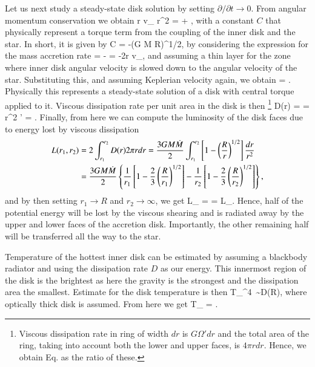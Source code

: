 Let us next study a steady-state disk solution by setting $\partial/\partial t \rightarrow 0$.
From angular momentum conservation we obtain
\be
r \Sigma v_{} r^2 \Omega =  + ,
\ee
with a constant $C$ that physically represent a torque term from the coupling of the inner disk and the star.
In short, it is given by
\be
C = -\Mdot (G M R)^{1/2},
\ee
by considering the expression for the mass accretion rate 
\be
\Mdot = - = -2\pi r \Sigma v_{},
\ee
and assuming a thin layer for the zone where inner disk angular velocity is slowed down to the angular velocity of the star.
Substituting this, and assuming Keplerian velocity again, we obtain
\be
\nu \Sigma = \frac{\Mdot}{3\pi} .
\ee
Physically this represents a steady-state solution of a disk with central torque applied to it.
Viscous dissipation rate per unit area in the disk is then%
\footnote{Viscous dissipation rate in ring of width $dr$ is $G \Omega' dr$ and the total area of the ring, taking into account both the lower and upper faces, is $4\pi r dr$. Hence, we obtain Eq.  as the ratio of these.
}
\be\label{eq:D}
D(r) =  =  \nu \Sigma r^2 \Omega' =  .
\ee
Finally, from here we can compute the luminosity of the disk faces due to energy lost by viscous dissipation
\begin{align}\begin{split}
    L(r_1, r_2)  &= 2 \int_{r_1}^{r_2} D(r) 2\pi r dr = \frac{3 G M \dot{M}}{2} \int_{r_1}^{r_2} \left[ 1 - \left( \frac{R}{r} \right)^{1/2} \right] \frac{dr}{r^2} \\
 & = \frac{3 G M \dot{M}}{2} \left\{ \frac{1}{r_1} \left[ 1 - \frac{2}{3}\left( \frac{R}{r_1} \right)^{1/2} \right] -  \frac{1}{r_2} \left[ 1 - \frac{2}{3}\left( \frac{R}{r_2} \right)^{1/2} \right] \right\}, 
\end{split}\end{align}
and by then setting $r_1 \rightarrow R$ and $r_2 \rightarrow \infty$, we get
\be
L_{} =  =  L_{}.
\ee
Hence, half of the potential energy will be lost by the viscous shearing and is radiated away by the upper and lower faces of the accretion disk.
Importantly, the other remaining half will be transferred all the way to the star.

Temperature of the hottest inner disk can be estimated by assuming a blackbody radiator and using the dissipation rate $D$ as our energy.
This innermost region of the disk is the brightest as here the gravity is the strongest and the dissipation area the smallest.
Estimate for the disk temperature is then 
\be
\sigma T_{}^4 \sim D(R),
\ee
where optically thick disk is assumed.
From here we get
\be
T_{} = .
\ee


